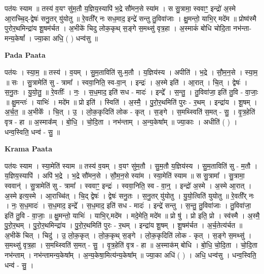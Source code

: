 \documentclass[17pt]{extarticle}
\begin{document}
पत॑यः स्याम ॥ तस्य॑ व॒यꣳ सु॑म॒तौ य॒ज्ञिय॒स्यापि॑ भ॒द्रे सौ॑मन॒से स्या॑म । स सु॒त्रामा॒ स्ववाꣳ॒॒ इन्द्रो॑ अ॒स्मे आ॒राच्चि॒द्-द्वेषः॑ सनु॒तर् यु॑योतु ॥ रे॒वती᳚र् नः सध॒माद॒ इन्द्रे॑ सन्तु तु॒विवा॑जाः । क्षु॒मन्तो॒ याभि॒र् मदे॑म ॥ प्रोष्व॑स्मै पुरोर॒थमिन्द्रा॑य शू॒षम॑र्चत । अ॒भीके॑ चिदु लोक॒कृथ् स॒ङ्गे स॒मथ्सु॑ वृत्र॒हा । अ॒स्माकं॑ बोधि चोदि॒ता नभ॑न्ता-मन्य॒केषां᳚ । ज्या॒का अधि॒ ( ) धन्व॑सु ॥ \newline

\textbf{Pada Paata} \newline

पत॑यः । स्या॒म॒ ॥ तस्य॑ । व॒यम् । सु॒म॒ताविति॑ सु-म॒तौ । य॒ज्ञिय॑स्य । अपीति॑ । भ॒द्रे । सौ॒म॒न॒से । स्या॒म॒ ॥ सः । सु॒त्रामेति॑ सु - त्रामा᳚ । स्ववा॒निति॒ स्व-वा॒न् । इन्द्रः॑ । अ॒स्मे इति॑ । आ॒रात् । चि॒त् । द्वेषः॑ । स॒नु॒तः । यु॒यो॒तु॒ ॥ रे॒वतीः᳚ । नः॒ । स॒ध॒माद॒ इति॑ सध - मादः॑ । इन्द्रे᳚ । स॒न्तु॒ । तु॒विवा॑जा॒ इति॑ तु॒वि - वा॒जाः॒ ॥ क्षु॒मन्तः॑ । याभिः॑ । मदे॑म ॥ प्रो इति॑ । स्विति॑ । अ॒स्मै॒ । पु॒रो॒र॒थमिति॑ पुरः - र॒थम् । इन्द्रा॑य । शू॒षम् । अ॒र्च॒त॒ ॥ अ॒भीके᳚ । चि॒त् । उ॒ । लो॒क॒कृदिति॑ लोक - कृत् । स॒ङ्गे । स॒मथ्स्विति॑ स॒मत् - सु॒ । वृ॒त्र॒हेति॑ वृत्र - हा ॥ अ॒स्माक᳚म् । बो॒धि॒ । चो॒दि॒ता । नभ॑न्ताम् । अ॒न्य॒केषा᳚म् ॥ ज्या॒काः । अधीति॑ ( ) । धन्व॒स्विति॒ धन्व॑ - सु॒ ॥  \newline


\textbf{Krama Paata} \newline

पत॑यः स्याम । स्या॒मेति॑ स्याम ॥ तस्य॑ व॒यम् । व॒यꣳ सु॑म॒तौ । सु॒म॒तौ य॒ज्ञिय॑स्य । सु॒म॒ताविति॑ सु - म॒तौ । य॒ज्ञिय॒स्यापि॑ । अपि॑ भ॒द्रे । भ॒द्रे सौ॑मन॒से । सौ॒म॒न॒से स्या॑म । स्या॒मेति॑ स्याम ॥ स सु॒त्रामा᳚ । सु॒त्रामा॒ स्ववान्॑ । सु॒त्रामेति॑ सु - त्रामा᳚ । स्ववाꣳ॒॒ इन्द्रः॑ । स्ववा॒निति॒ स्व - वा॒न्॒ । इन्द्रो॑ अ॒स्मे । अ॒स्मे आ॒रात् । अ॒स्मे इत्य॒स्मे । आ॒राच्चि॑त् । चि॒द् द्वेषः॑ । द्वेषः॑ सनु॒तः । स॒नु॒तर् यु॑योतु । यु॒यो॒त्विति॑ युयोतु ॥ रे॒वती᳚र् नः । नः॒ स॒ध॒मादः॑ । स॒ध॒माद॒ इन्द्रे᳚ । स॒ध॒माद॒ इति॑ सध - मादः॑ । इन्द्रे॑ सन्तु । स॒न्तु॒ तु॒विवा॑जाः । तु॒विवा॑जा॒ इति॑ तु॒वि - वा॒जाः॒ ॥ क्षु॒मन्तो॒ याभिः॑ । याभि॒र्,मदे॑म । मदे॒मेति॒ मदे॑म ॥ प्रो षु॑ । प्रो इति॒ प्रो । स्व॑स्मै । अ॒स्मै॒ पु॒रो॒र॒थम् । पु॒रो॒र॒थमिन्द्रा॑य । पु॒रो॒र॒थमिति॑ पुरः - र॒थम् । इन्द्रा॑य शू॒षम् । शू॒षम॑र्चत । अ॒र्च॒तेत्य॑र्चत ॥ अ॒भीके॑ चित् । चिदु॑ । उ॒ लो॒क॒कृत् । लो॒क॒कृथ् स॒ङ्गे । लो॒क॒कृदिति॑ लोक - कृत् । स॒ङ्गे स॒मथ्सु॑ । स॒मथ्सु॑ वृत्र॒हा । स॒मथ्स्विति॑ स॒मत् - सु॒ । वृ॒त्र॒हेति॑ वृत्र - हा ॥ अ॒स्माक॑म् बोधि । बो॒धि॒ चो॒दि॒ता । चो॒दि॒ता नभ॑न्ताम् । नभ॑न्तामन्य॒केषा᳚म् । अ॒न्य॒केषा॒मित्य॑न्य॒केषा᳚म् ॥ ज्या॒का अधि॑ ( ) । अधि॒ धन्व॑सु । धन्व॒स्विति॒ धन्व॑ - सु॒ । \newline
\end{document}
